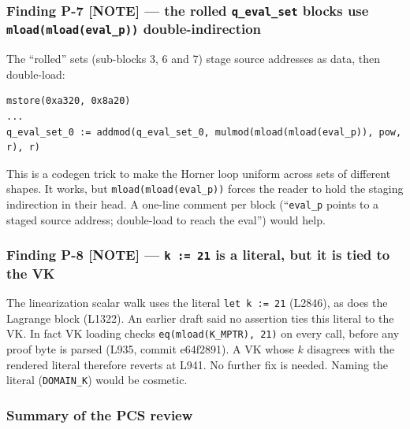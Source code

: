 \subsubsection*{Finding P-7 \textcolor{mathpurple}{[NOTE]} --- the rolled \texttt{q\_eval\_set} blocks use \texttt{mload(mload(eval\_\allowbreak{}p))} double-indirection}

The ``rolled'' sets (sub-blocks 3, 6 and 7) stage source addresses
as data, then double-load:

\begin{lstlisting}[style=yul]
mstore(0xa320, 0x8a20)
...
q_eval_set_0 := addmod(q_eval_set_0, mulmod(mload(mload(eval_p)), pow, r), r)
\end{lstlisting}

This is a codegen trick to make the Horner loop uniform across sets
of different shapes. It works, but \texttt{mload(mload(eval\_\allowbreak{}p))}
forces the reader to hold the staging indirection in their head. A
one-line comment per block (``\texttt{eval\_p} points to a staged
source address; double-load to reach the eval'') would help.

\subsubsection*{Finding P-8 \textcolor{mathpurple}{[NOTE]} --- \texttt{k := 21} is a literal, but it is tied to the VK}

The linearization scalar walk uses the literal \texttt{let k := 21}
(L2846), as does the Lagrange block (L1322). 
An earlier draft said no assertion ties this literal to the VK. In
fact VK loading checks \texttt{eq(mload(K\_\allowbreak{}MPTR), 21)} on every call,
before any proof byte is parsed (L935, commit e64f2891). A VK whose
$k$ disagrees with the rendered literal therefore reverts at L941.
No further fix is needed. Naming the literal
(\texttt{DOMAIN\_K}) would be cosmetic.

\subsubsection*{Summary of the PCS review}

